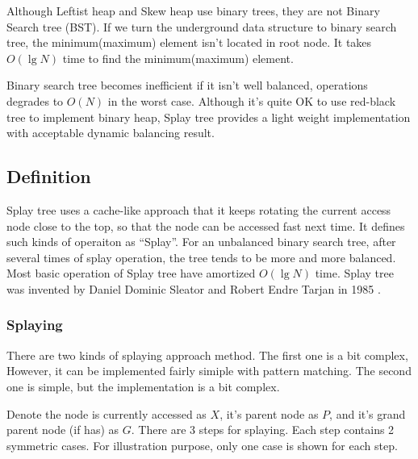 \documentclass{article}
\begin{document}
Although Leftist heap and Skew heap use binary trees, they
are not Binary Search tree (BST). If we turn the underground
data structure to binary search tree, the minimum(maximum)
element isn't located in root node. It takes $O(\lg N)$ time
to find the minimum(maximum) element.

Binary search tree becomes inefficient if it isn't well
balanced, operations degrades to $O(N)$ in the worst case.
Although it's quite OK to use red-black tree to implement
binary heap, Splay tree provides a light weight implementation
with acceptable dynamic balancing result.

\subsection{Definition}

Splay tree uses a cache-like approach that it keeps rotating the current
access node close to the top, so that the node can be accessed fast
next time. It defines such kinds of operaiton as ``Splay''. For an 
unbalanced binary search tree, after several times of splay operation, the
tree tends to be more and more balanced. Most basic operation of 
Splay tree have amortized $O(\lg N)$ time. Splay tree was invented
by Daniel Dominic Sleator and Robert Endre Tarjan in 1985\cite{wiki-splay-tree} 
\cite{self-adjusting-trees}.

\subsubsection{Splaying}

There are two kinds of splaying approach method. The first one is
a bit complex, However, it can be implemented fairly simiple with
pattern matching. The second one is simple, but the implementation
is a bit complex.

Denote the node is currently accessed as $X$, it's parent node as $P$,
and it's grand parent node (if has) as $G$. There are 3 steps for 
splaying. Each step contains 2 symmetric cases. For illustration 
purpose, only one case is shown for each step.
\end{document}
